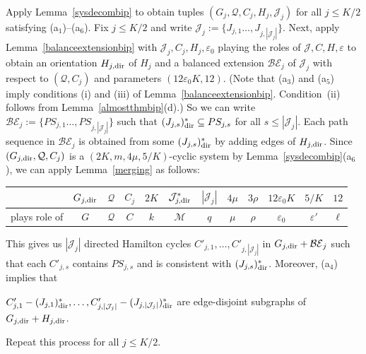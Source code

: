 \documentclass{memo-l}
\def\COMMENT#1{}
\def\eps{\varepsilon}
\numberwithin{section}{chapter}
\numberwithin{equation}{section}
\numberwithin{firstthm}{section}
\numberwithin{figure}{section}
\begin{document}
{\removelastskip{}\medskip{}
Apply Lemma~\ref{sysdecombip} to obtain tuples $(G_{j}, \mathcal{Q}, C_{j}, H_{j}, \mathcal{J}_{j})$ for all $j \le K/2$
satisfying (a$_1$)--(a$_6$). Fix $j \le K/2$ and write $\mathcal{J}_{j} :=\{J_{j,1}\dots,J_{j,|\mathcal{J}_{j}|}\}$.
Next, apply Lemma~\ref{balanceextensionbip} with $\mathcal{J}_{j},C_{j}, H_{j},  \eps_{0}$ playing the roles
of $\mathcal{J}, C, H, \eps$ to obtain an orientation $H_{j,{\rm dir}}$ of $H_j$ and a balanced extension $\mathcal{BE}_j$ of $\mathcal{J}_{j}$ with respect to
$(\mathcal{Q}, C_{j})$ and parameters $(12 \eps_0 K,12)$.
(Note that (a$_3$) and (a$_5$) imply conditions (i) and (iii) of Lemma~\ref{balanceextensionbip}.
Condition~(ii) follows from Lemma~\ref{almostthmbip}(d).)
So we can write $\mathcal{BE}_j :=\{PS_{j,1}\dots,PS_{j,|\mathcal{J}_{j}|}\}$ such that $(J_{j,s})^*_{\rm dir} \subseteq PS_{j,s}$ for all $s \le |\mathcal{J}_{j}|$.
Each path sequence in $\mathcal{BE}_j$ is obtained from some $(J_{j,s})^*_{\rm dir}$ by adding edges
of $H_{j,{\rm dir}}$.
Since $(G_{j, {\rm dir}}, \mathcal{Q}, C_{j})$ is a $(2K,m, 4 \mu, 5/K)$-cyclic system by Lemma~\ref{sysdecombip}(a$_6$), we can apply Lemma~\ref{merging} 
as follows:
\smallskip
\begin{center}
  \begin{tabular}{ r | c | c | c | c | c | c | c | c | c | c |c}
& $G_{j, {\rm dir}}$ & $\mathcal{Q}$ &  $C_{j}$  &  $2K$ & $\mathcal{J}^*_{j,{\rm dir}}$ & $|\mathcal{J}_j|$ & $4 \mu$ & $3\rho$ & $12\eps_{0}K$ & $5/K$ & $12$ \\ \hline
plays role of & $G$ & $\mathcal{Q}$ &  $C$ & $k$ & $\mathcal{M}$ & $q$ & $\mu$ & $\rho$ &  $\eps_0$ & $\eps'$ & $\ell$ \\
 \end{tabular}
\end{center}
\smallskip
\noindent
This gives us $|\mathcal{J}_{j}|$ directed Hamilton cycles $C'_{j,1}, \dots, C'_{j,|\mathcal{J}_{j}|}$ in $G_{j, {\rm dir}} + \mathcal{BE}_j$
such that each $C'_{j,s}$ contains $PS_{j,s}$ and is consistent with $(J_{j,s})^*_{\rm dir}$.
Moreover, (a$_4$) implies that%
     \COMMENT{Daniela: added (a$_4$) implies that}
$C'_{j,1} - (J_{j,1})^*_{\rm dir}, \dots, C'_{j,|\mathcal{J}_{j}|} - (J_{j,|\mathcal{J}_{j}|})^*_{\rm dir}$ are edge-disjoint subgraphs of $G_{j, {\rm dir}}+ H_{j, {\rm dir}}$.%
	\COMMENT{Allan: more details added.}
Repeat this process for all $j \le K/2$.

}
\end{document}
